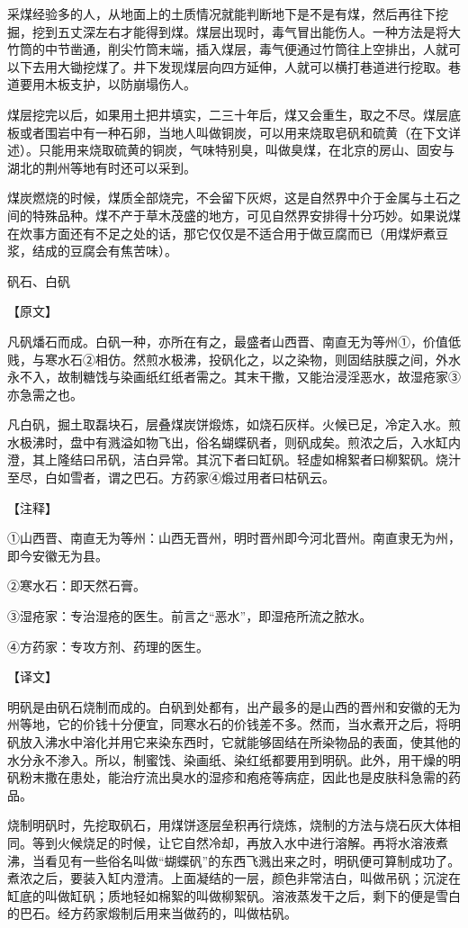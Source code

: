 \documentclass[12pt,UTF8]{ctexbook}
\begin{document}
采煤经验多的人，从地面上的土质情况就能判断地下是不是有煤，然后再往下挖掘，挖到五丈深左右才能得到煤。煤层出现时，毒气冒出能伤人。一种方法是将大竹筒的中节凿通，削尖竹筒末端，插入煤层，毒气便通过竹筒往上空排出，人就可以下去用大锄挖煤了。井下发现煤层向四方延伸，人就可以横打巷道进行挖取。巷道要用木板支护，以防崩塌伤人。

煤层挖完以后，如果用土把井填实，二三十年后，煤又会重生，取之不尽。煤层底板或者围岩中有一种石卵，当地人叫做铜炭，可以用来烧取皂矾和硫黄（在下文详述）。只能用来烧取硫黄的铜炭，气味特别臭，叫做臭煤，在北京的房山、固安与湖北的荆州等地有时还可以采到。

煤炭燃烧的时候，煤质全部烧完，不会留下灰烬，这是自然界中介于金属与土石之间的特殊品种。煤不产于草木茂盛的地方，可见自然界安排得十分巧妙。如果说煤在炊事方面还有不足之处的话，那它仅仅是不适合用于做豆腐而已（用煤炉煮豆浆，结成的豆腐会有焦苦味）。

矾石、白矾

【原文】

凡矾燔石而成。白矾一种，亦所在有之，最盛者山西晋、南直无为等州①，价值低贱，与寒水石②相仿。然煎水极沸，投矾化之，以之染物，则固结肤膜之间，外水永不入，故制糖饯与染画纸红纸者需之。其末干撒，又能治浸淫恶水，故湿疮家③亦急需之也。

凡白矾，掘土取磊块石，层叠煤炭饼煅炼，如烧石灰样。火候已足，冷定入水。煎水极沸时，盘中有溅溢如物飞出，俗名蝴蝶矾者，则矾成矣。煎浓之后，入水缸内澄，其上隆结曰吊矾，洁白异常。其沉下者曰缸矾。轻虚如棉絮者曰柳絮矾。烧汁至尽，白如雪者，谓之巴石。方药家④煅过用者曰枯矾云。

【注释】

①山西晋、南直无为等州：山西无晋州，明时晋州即今河北晋州。南直隶无为州，即今安徽无为县。

②寒水石：即天然石膏。

③湿疮家：专治湿疮的医生。前言之“恶水”，即湿疮所流之脓水。

④方药家：专攻方剂、药理的医生。

【译文】

明矾是由矾石烧制而成的。白矾到处都有，出产最多的是山西的晋州和安徽的无为州等地，它的价钱十分便宜，同寒水石的价钱差不多。然而，当水煮开之后，将明矾放入沸水中溶化并用它来染东西时，它就能够固结在所染物品的表面，使其他的水分永不渗入。所以，制蜜饯、染画纸、染红纸都要用到明矾。此外，用干燥的明矾粉末撒在患处，能治疗流出臭水的湿疹和疱疮等病症，因此也是皮肤科急需的药品。

烧制明矾时，先挖取矾石，用煤饼逐层垒积再行烧炼，烧制的方法与烧石灰大体相同。等到火候烧足的时候，让它自然冷却，再放入水中进行溶解。再将水溶液煮沸，当看见有一些俗名叫做“蝴蝶矾”的东西飞溅出来之时，明矾便可算制成功了。煮浓之后，要装入缸内澄清。上面凝结的一层，颜色非常洁白，叫做吊矾；沉淀在缸底的叫做缸矾；质地轻如棉絮的叫做柳絮矾。溶液蒸发干之后，剩下的便是雪白的巴石。经方药家煅制后用来当做药的，叫做枯矾。
\end{document}
